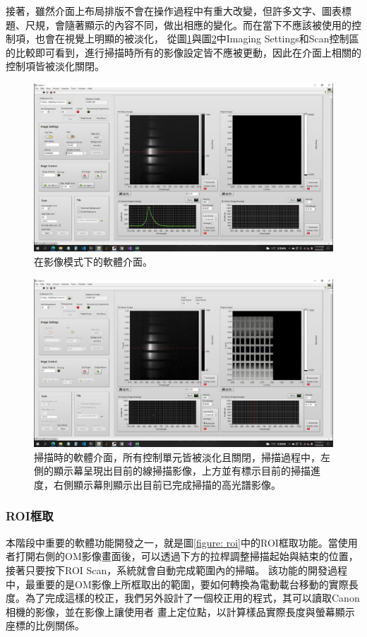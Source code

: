 \documentclass[12pt]{article}
\begin{document}
接著，雖然介面上布局排版不會在操作過程中有重大改變，但許多文字、圖表標題、尺規，會隨著顯示的內容不同，做出相應的變化。而在當下不應該被使用的控制項，也會在視覺上明顯的被淡化，
從圖\ref{figure: acquire mode}與圖\ref{figure: scanning}中Imaging Settings和Scan控制區的比較即可看到，進行掃描時所有的影像設定皆不應被更動，因此在介面上相關的控制項皆被淡化關閉。
\begin{figure}
    \centering
    \includegraphics[width=\linewidth]{acquire.jpeg}
    \caption{在影像模式下的軟體介面。}
    \label{figure: acquire mode}
\end{figure}
\begin{figure}
    \centering
    \includegraphics[width=\linewidth]{scanning.jpeg}
    \caption[掃描時的軟體介面。]{掃描時的軟體介面，所有控制單元皆被淡化且關閉，掃描過程中，左側的顯示幕呈現出目前的線掃描影像，上方並有標示目前的掃描進度，右側顯示幕則顯示出目前已完成掃描的高光譜影像。}
    \label{figure: scanning}
\end{figure}
\subsubsection{ROI框取}
本階段中重要的軟體功能開發之一，就是圖\ref{figure: roi}中的ROI框取功能。當使用者打開右側的OM影像畫面後，可以透過下方的拉桿調整掃描起始與結束的位置，接著只要按下ROI Scan，系統就會自動完成範圍內的掃瞄。
該功能的開發過程中，最重要的是OM影像上所框取出的範圍，要如何轉換為電動載台移動的實際長度。為了完成這樣的校正，我們另外設計了一個校正用的程式，其可以讀取Canon 相機的影像，並在影像上讓使用者
畫上定位點，以計算樣品實際長度與螢幕顯示座標的比例關係。
\end{document}
